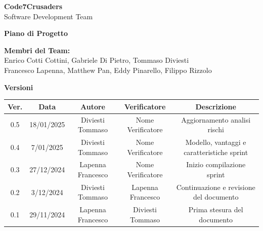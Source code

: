 \documentclass{article}
\begin{document}
\begin{titlepage}
    {\Huge \textbf{Code7Crusaders}}\\
    \vspace{0.5cm}
    {\Large Software Development Team}\\
    \vspace{2cm}

    {\large \textbf{Piano di Progetto}}\\
    \vspace{5cm}


    \textbf{Membri del Team:}\\
    Enrico Cotti Cottini, Gabriele Di Pietro, Tommaso Diviesti \\
    Francesco Lapenna, Matthew Pan, Eddy Pinarello, Filippo Rizzolo \\
    \vspace{0.5cm}

    \vspace{1cm}
\end{titlepage}



\newpage
\begin{table}[h!]
\centering
\textbf{Versioni} \\ %
\vspace{2mm} %
\begin{tabular}{|c|c|c|c|c|}
    \hline
    \textbf{Ver.} & \textbf{Data} & \textbf{Autore} & \textbf{Verificatore} & \textbf{Descrizione} \\
    \hline
    0.5 & 18/01/2025 & Diviesti Tommaso & Nome Verificatore & Aggiornamento analisi rischi \\
    0.4 & 7/01/2025 & Diviesti Tommaso & Nome Verificatore & Modello, vantaggi e caratteristiche sprint \\
    0.3 & 27/12/2024 & Lapenna Francesco & Nome Verificatore & Inizio compilazione sprint \\
    0.2 & 3/12/2024 & Diviesti Tommaso & Lapenna Francesco & Continuazione e revisione del documento \\
    0.1 & 29/11/2024 & Lapenna Francesco & Diviesti Tommaso & Prima stesura del documento \\
    \hline
\end{tabular}
\end{table}
\end{document}
